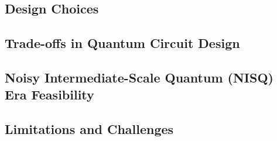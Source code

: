 \subsection{Design Choices}

\subsection{Trade-offs in Quantum Circuit Design}

\subsection{Noisy Intermediate-Scale Quantum (NISQ) Era Feasibility}

\subsection{Limitations and Challenges}